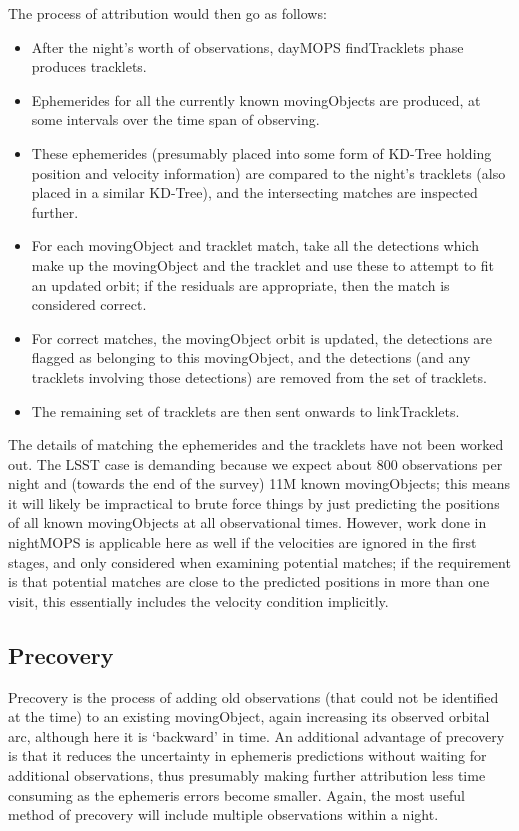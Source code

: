 The process of attribution would then go as follows: 
\begin{itemize}
\item{After the night's worth of observations, dayMOPS findTracklets phase produces tracklets.}
\item{Ephemerides for all the currently known movingObjects are produced, at some intervals over the time span of observing.}
\item{These ephemerides (presumably placed into some form of KD-Tree holding position and velocity information) are compared to the night's tracklets (also placed in a similar KD-Tree), and the intersecting matches are inspected further.}
\item{For each movingObject and tracklet match, take all the detections which make up the movingObject and the tracklet and use these to attempt to fit an updated orbit; if the residuals are appropriate, then the match is considered correct.}
\item{For correct matches, the movingObject orbit is updated, the detections are flagged as belonging to this movingObject, and the detections (and any tracklets involving those detections) are removed from the set of tracklets.}
\item{The remaining set of tracklets are then sent onwards to linkTracklets.}
\end{itemize}

The details of matching the ephemerides and the tracklets have not been worked out. The LSST case is demanding because we expect about 800 observations per night and (towards the end of the survey) 11M known movingObjects; this means it will likely be impractical to brute force things by just predicting the positions of all known movingObjects at all observational times. However, work done in nightMOPS is applicable here as well if the velocities are ignored in the first stages, and only considered when examining potential matches; if the requirement is that potential matches are close to the predicted positions in more than one visit, this essentially includes the velocity condition implicitly. 

\subsection{Precovery}

Precovery is the process of adding old observations (that could not be identified at the time) to an existing movingObject, again increasing its observed orbital arc, although here it is `backward' in time. An additional advantage of precovery is that it reduces the uncertainty in ephemeris predictions without waiting for additional observations, thus presumably making further attribution less time consuming as the ephemeris errors become smaller. Again, the most useful method of precovery will include multiple observations within a night.  

